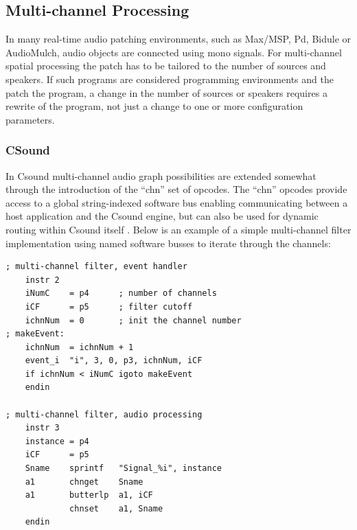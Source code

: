 \documentclass[twoside,a4paper]{article}
\begin{document}


\subsection{Multi-channel Processing} %

In many real-time audio patching environments, such as Max/MSP, Pd, Bidule or AudioMulch, audio objects are connected using mono signals. 
For multi-channel spatial processing the patch has to be tailored to the number of sources and speakers. 
If such programs are considered programming environments and the patch the program, a change in the number of sources or speakers requires a rewrite of the program, not just a change to one or more configuration parameters.


\subsubsection{CSound} %

In Csound multi-channel audio graph possibilities are extended somewhat through the introduction of the ``chn'' set of opcodes.
The ``chn'' opcodes provide access to a global string-indexed software bus enabling communicating between a host application and the Csound engine, but can also be used for dynamic routing within Csound itself \cite{Yi:2006}.
Below is an example of a simple multi-channel filter implementation using named software busses to iterate through the channels:


\begin{lstlisting}
; multi-channel filter, event handler 
    instr 2 
    iNumC    = p4      ; number of channels 
    iCF      = p5      ; filter cutoff 
    ichnNum  = 0       ; init the channel number 
; makeEvent:
    ichnNum  = ichnNum + 1
    event_i  "i", 3, 0, p3, ichnNum, iCF
    if ichnNum < iNumC igoto makeEvent
    endin

; multi-channel filter, audio processing
    instr 3    
    instance = p4
    iCF      = p5
    Sname    sprintf   "Signal_%i", instance        
    a1       chnget    Sname
    a1       butterlp  a1, iCF
             chnset    a1, Sname
    endin
\end{lstlisting}  
\end{document}
